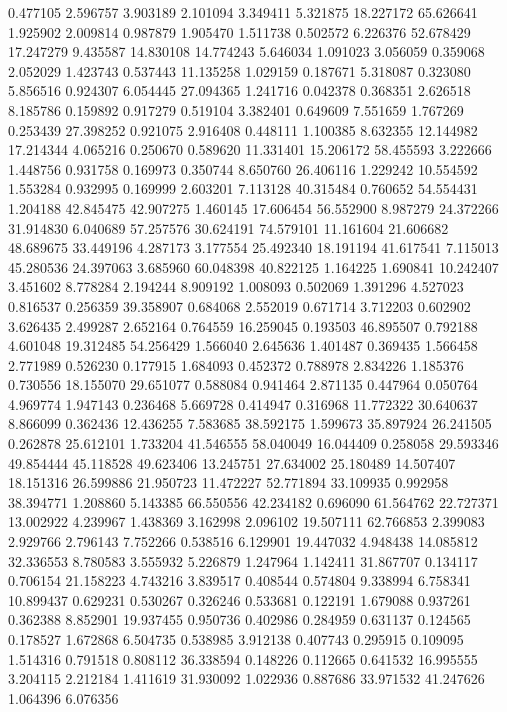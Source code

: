 0.477105
2.596757
3.903189
2.101094
3.349411
5.321875
18.227172
65.626641
1.925902
2.009814
0.987879
1.905470
1.511738
0.502572
6.226376
52.678429
17.247279
9.435587
14.830108
14.774243
5.646034
1.091023
3.056059
0.359068
2.052029
1.423743
0.537443
11.135258
1.029159
0.187671
5.318087
0.323080
5.856516
0.924307
6.054445
27.094365
1.241716
0.042378
0.368351
2.626518
8.185786
0.159892
0.917279
0.519104
3.382401
0.649609
7.551659
1.767269
0.253439
27.398252
0.921075
2.916408
0.448111
1.100385
8.632355
12.144982
17.214344
4.065216
0.250670
0.589620
11.331401
15.206172
58.455593
3.222666
1.448756
0.931758
0.169973
0.350744
8.650760
26.406116
1.229242
10.554592
1.553284
0.932995
0.169999
2.603201
7.113128
40.315484
0.760652
54.554431
1.204188
42.845475
42.907275
1.460145
17.606454
56.552900
8.987279
24.372266
31.914830
6.040689
57.257576
30.624191
74.579101
11.161604
21.606682
48.689675
33.449196
4.287173
3.177554
25.492340
18.191194
41.617541
7.115013
45.280536
24.397063
3.685960
60.048398
40.822125
1.164225
1.690841
10.242407
3.451602
8.778284
2.194244
8.909192
1.008093
0.502069
1.391296
4.527023
0.816537
0.256359
39.358907
0.684068
2.552019
0.671714
3.712203
0.602902
3.626435
2.499287
2.652164
0.764559
16.259045
0.193503
46.895507
0.792188
4.601048
19.312485
54.256429
1.566040
2.645636
1.401487
0.369435
1.566458
2.771989
0.526230
0.177915
1.684093
0.452372
0.788978
2.834226
1.185376
0.730556
18.155070
29.651077
0.588084
0.941464
2.871135
0.447964
0.050764
4.969774
1.947143
0.236468
5.669728
0.414947
0.316968
11.772322
30.640637
8.866099
0.362436
12.436255
7.583685
38.592175
1.599673
35.897924
26.241505
0.262878
25.612101
1.733204
41.546555
58.040049
16.044409
0.258058
29.593346
49.854444
45.118528
49.623406
13.245751
27.634002
25.180489
14.507407
18.151316
26.599886
21.950723
11.472227
52.771894
33.109935
0.992958
38.394771
1.208860
5.143385
66.550556
42.234182
0.696090
61.564762
22.727371
13.002922
4.239967
1.438369
3.162998
2.096102
19.507111
62.766853
2.399083
2.929766
2.796143
7.752266
0.538516
6.129901
19.447032
4.948438
14.085812
32.336553
8.780583
3.555932
5.226879
1.247964
1.142411
31.867707
0.134117
0.706154
21.158223
4.743216
3.839517
0.408544
0.574804
9.338994
6.758341
10.899437
0.629231
0.530267
0.326246
0.533681
0.122191
1.679088
0.937261
0.362388
8.852901
19.937455
0.950736
0.402986
0.284959
0.631137
0.124565
0.178527
1.672868
6.504735
0.538985
3.912138
0.407743
0.295915
0.109095
1.514316
0.791518
0.808112
36.338594
0.148226
0.112665
0.641532
16.995555
3.204115
2.212184
1.411619
31.930092
1.022936
0.887686
33.971532
41.247626
1.064396
6.076356
